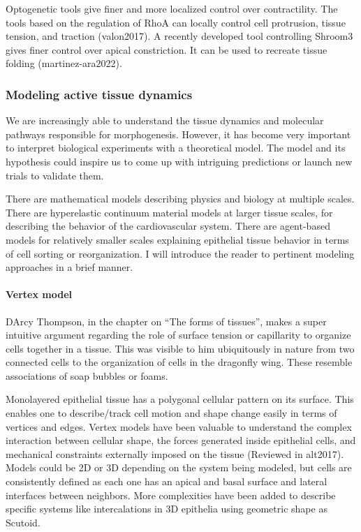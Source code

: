 \documentclass[
]{article}
\begin{document}
Optogenetic tools give finer and more localized control over
contractility. The tools based on the regulation of RhoA can locally
control cell protrusion, tissue tension, and traction (valon2017). A
recently developed tool controlling Shroom3 gives finer control over
apical constriction. It can be used to recreate tissue folding
(martinez-ara2022).

\hypertarget{modeling-active-tissue-dynamics}{%
\subsubsection{Modeling active tissue
dynamics}\label{modeling-active-tissue-dynamics}}

We are increasingly able to understand the tissue dynamics and molecular
pathways responsible for morphogenesis. However, it has become very
important to interpret biological experiments with a theoretical model.
The model and its hypothesis could inspire us to come up with intriguing
predictions or launch new trials to validate them.

There are mathematical models describing physics and biology at multiple
scales. There are hyperelastic continuum material models at larger
tissue scales, for describing the behavior of the cardiovascular system.
There are agent-based models for relatively smaller scales explaining
epithelial tissue behavior in terms of cell sorting or reorganization. I
will introduce the reader to pertinent modeling approaches in a brief
manner.

\hypertarget{vertex-model}{%
\paragraph{Vertex model}\label{vertex-model}}

D\textquotesingle Arcy Thompson, in the chapter on ``The forms of
tissues'', makes a super intuitive argument regarding the role of
surface tension or capillarity to organize cells together in a tissue.
This was visible to him ubiquitously in nature from two connected cells
to the organization of cells in the dragonfly wing. These resemble
associations of soap bubbles or foams.

Monolayered epithelial tissue has a polygonal cellular pattern on its
surface. This enables one to describe/track cell motion and shape change
easily in terms of vertices and edges. Vertex models have been valuable
to understand the complex interaction between cellular shape, the forces
generated inside epithelial cells, and mechanical constraints externally
imposed on the tissue (Reviewed in alt2017). Models could be 2D or 3D
depending on the system being modeled, but cells are consistently
defined as each one has an apical and basal surface and lateral
interfaces between neighbors. More complexities have been added to
describe specific systems like intercalations in 3D epithelia using
geometric shape as Scutoid.
\end{document}

